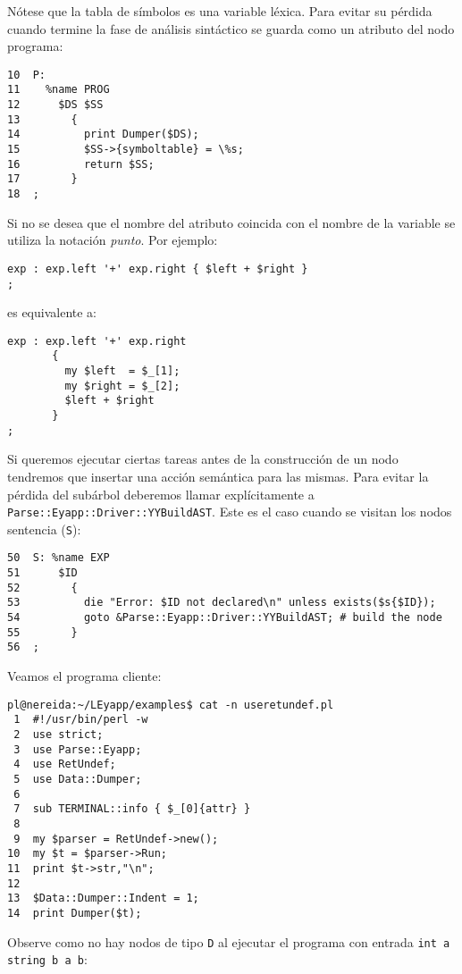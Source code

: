 Nótese que la tabla de símbolos es una variable léxica. Para evitar 
su pérdida cuando termine la fase de análisis sintáctico
se guarda como un atributo del nodo programa:
\begin{verbatim}
10  P:
11    %name PROG
12      $DS $SS
13        {
14          print Dumper($DS);
15          $SS->{symboltable} = \%s;
16          return $SS;
17        }
18  ;
\end{verbatim}

Si no se desea que el nombre del atributo coincida con el nombre de la variable
se utiliza la notación \emph{punto}. Por ejemplo:


\begin{verbatim}
exp : exp.left '+' exp.right { $left + $right }
;
\end{verbatim}

es equivalente a:

\begin{verbatim}
exp : exp.left '+' exp.right 
       { 
         my $left  = $_[1];
         my $right = $_[2];
         $left + $right 
       }
;
\end{verbatim}


Si queremos ejecutar ciertas tareas antes de la construcción de
un nodo tendremos que insertar una acción semántica para las mismas.
Para evitar la pérdida del subárbol deberemos llamar explícitamente
a \verb|Parse::Eyapp::Driver::YYBuildAST|. Este es el caso
cuando se visitan los nodos sentencia (\verb|S|):

\begin{verbatim}
50  S: %name EXP
51      $ID
52        {
53          die "Error: $ID not declared\n" unless exists($s{$ID});
54          goto &Parse::Eyapp::Driver::YYBuildAST; # build the node
55        }
56  ;
\end{verbatim}


Veamos el programa cliente:
\begin{verbatim}
pl@nereida:~/LEyapp/examples$ cat -n useretundef.pl
 1  #!/usr/bin/perl -w
 2  use strict;
 3  use Parse::Eyapp;
 4  use RetUndef;
 5  use Data::Dumper;
 6
 7  sub TERMINAL::info { $_[0]{attr} }
 8
 9  my $parser = RetUndef->new();
10  my $t = $parser->Run;
11  print $t->str,"\n";
12
13  $Data::Dumper::Indent = 1;
14  print Dumper($t);
\end{verbatim}
Observe como no hay nodos de tipo \verb|D|  al ejecutar el 
programa con entrada \verb|int a string b a b|:

